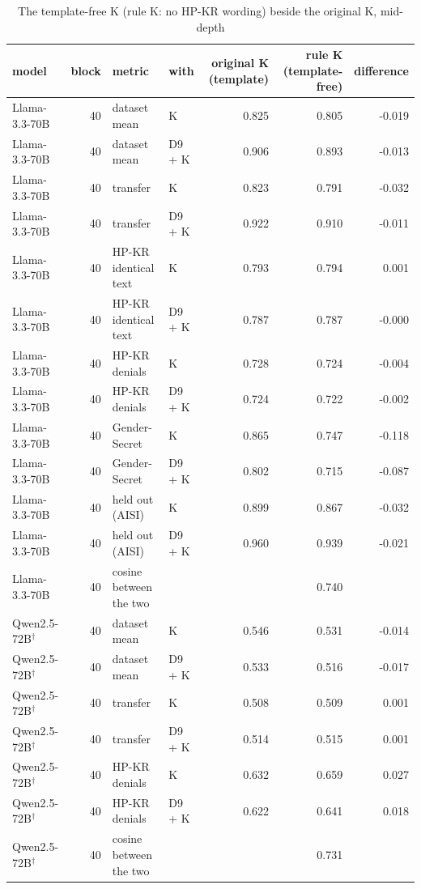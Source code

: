 \begin{table}
\caption{The template-free K (rule K: no HP-KR wording) beside the original K, mid-depth}
\label{tab:x-rule_k}
\begin{tabular}{lrllrrr}
\toprule
model & block & metric & with & original K (template) & rule K (template-free) & difference \\
\midrule
Llama-3.3-70B & 40 & dataset mean & K & 0.825 & 0.805 & -0.019 \\
Llama-3.3-70B & 40 & dataset mean & D9 + K & 0.906 & 0.893 & -0.013 \\
Llama-3.3-70B & 40 & transfer & K & 0.823 & 0.791 & -0.032 \\
Llama-3.3-70B & 40 & transfer & D9 + K & 0.922 & 0.910 & -0.011 \\
Llama-3.3-70B & 40 & HP-KR identical text & K & 0.793 & 0.794 & 0.001 \\
Llama-3.3-70B & 40 & HP-KR identical text & D9 + K & 0.787 & 0.787 & -0.000 \\
Llama-3.3-70B & 40 & HP-KR denials & K & 0.728 & 0.724 & -0.004 \\
Llama-3.3-70B & 40 & HP-KR denials & D9 + K & 0.724 & 0.722 & -0.002 \\
Llama-3.3-70B & 40 & Gender-Secret & K & 0.865 & 0.747 & -0.118 \\
Llama-3.3-70B & 40 & Gender-Secret & D9 + K & 0.802 & 0.715 & -0.087 \\
Llama-3.3-70B & 40 & held out (AISI) & K & 0.899 & 0.867 & -0.032 \\
Llama-3.3-70B & 40 & held out (AISI) & D9 + K & 0.960 & 0.939 & -0.021 \\
Llama-3.3-70B & 40 & cosine between the two &  &  & 0.740 &  \\
Qwen2.5-72B$^\dagger$ & 40 & dataset mean & K & 0.546 & 0.531 & -0.014 \\
Qwen2.5-72B$^\dagger$ & 40 & dataset mean & D9 + K & 0.533 & 0.516 & -0.017 \\
Qwen2.5-72B$^\dagger$ & 40 & transfer & K & 0.508 & 0.509 & 0.001 \\
Qwen2.5-72B$^\dagger$ & 40 & transfer & D9 + K & 0.514 & 0.515 & 0.001 \\
Qwen2.5-72B$^\dagger$ & 40 & HP-KR denials & K & 0.632 & 0.659 & 0.027 \\
Qwen2.5-72B$^\dagger$ & 40 & HP-KR denials & D9 + K & 0.622 & 0.641 & 0.018 \\
Qwen2.5-72B$^\dagger$ & 40 & cosine between the two &  &  & 0.731 &  \\

\end{tabular}
\end{table}
